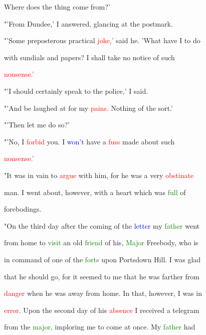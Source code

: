  Where does the thing come from?'



 "'From Dundee,' I answered, glancing at the postmark.



 "'Some preposterous practical \textcolor{red}{joke,'} said he. 'What have I to do

 with \textcolor{BurntOrange}{sundials} and papers? I shall take no notice of such

 \textcolor{red}{nonsense.'}



 "'I should certainly speak to the \textcolor{BurntOrange}{police,'} I said.



 "'And be \textcolor{BurntOrange}{laughed} at for my \textcolor{red}{pains.} Nothing of the sort.'



 "'Then let me do so?'



 "'No, I \textcolor{red}{forbid} you. I \textcolor{blue}{won't} have a \textcolor{red}{fuss} made about such

 \textcolor{red}{nonsense.'}



 "It was in vain to \textcolor{red}{argue} with him, for he was a very \textcolor{red}{obstinate}

 man. I went about, however, with a heart which was \textcolor{green}{full} of

 \textcolor{BurntOrange}{forebodings.}



 "On the third day after the coming of the \textcolor{blue}{letter} my \textcolor{green}{father} went

 from home to \textcolor{green}{visit} an old \textcolor{green}{friend} of his, \textcolor{green}{Major} Freebody, who is

 in command of one of the \textcolor{green}{forts} upon Portsdown Hill. I was \textcolor{BurntOrange}{glad}

 that he should go, for it seemed to me that he was farther from

 \textcolor{red}{danger} when he was away from home. In that, however, I was in

 \textcolor{red}{error.} Upon the second day of his \textcolor{red}{absence} I received a telegram

 from the \textcolor{green}{major,} imploring me to come at once. My \textcolor{green}{father} had

